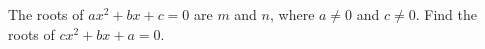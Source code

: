 The roots of $ax^2+bx+c=0$ are $m$ and $n$, where $a\ne0$ and $c\ne0$. Find the roots of $cx^2+bx+a=0$.
